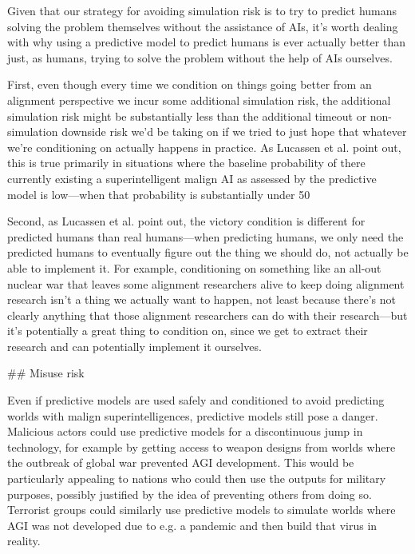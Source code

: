 {{Given that our strategy for avoiding simulation risk is to try to predict humans solving the problem themselves without the assistance of AIs, it's worth dealing with why using a predictive model to predict humans is ever actually better than just, as humans, trying to solve the problem without the help of AIs ourselves.

First, even though every time we condition on things going better from an alignment perspective we incur some additional simulation risk, the additional simulation risk might be substantially less than the additional timeout or non-simulation downside risk we'd be taking on if we tried to just hope that whatever we're conditioning on actually happens in practice. As Lucassen et al. point out, this is true primarily in situations where the baseline probability of there currently existing a superintelligent malign AI as assessed by the predictive model is low---when that probability is substantially under 50%

Second, as Lucassen et al. point out, the victory condition is different for predicted humans than real humans---when predicting humans, we only need the predicted humans to eventually figure out the thing we should do, not actually be able to implement it. For example, conditioning on something like an all-out nuclear war that leaves some alignment researchers alive to keep doing alignment research isn't a thing we actually want to happen, not least because there's not clearly anything that those alignment researchers can do with their research---but it's potentially a great thing to condition on, since we get to extract their research and can potentially implement it ourselves.


## Misuse risk

Even if predictive models are used safely and conditioned to avoid predicting worlds with malign superintelligences, predictive models still pose a danger. Malicious actors could use predictive models for a discontinuous jump in technology, for example by getting access to weapon designs from worlds where the outbreak of global war prevented AGI development. This would be particularly appealing to nations who could then use the outputs for military purposes, possibly justified by the idea of preventing others from doing so. Terrorist groups could similarly use predictive models to simulate worlds where AGI was not developed due to e.g. a pandemic and then build that virus in reality.

}}

